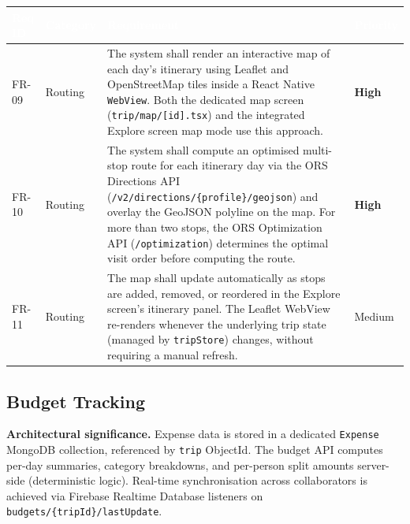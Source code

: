 \documentclass[12pt, a4paper]{article}
\newcommand{\reqid}[1]{\textsc{\small #1}}
\newcommand{\high}{\textbf{High}}
\newcommand{\medium}{Medium}
\newcommand{\thcell}[1]{\textcolor{white}{\textbf{\small #1}}}
\begin{document}
\vspace{0.4em}
\begin{longtable}{C{1.6cm} C{2.0cm} L{8.2cm} C{1.8cm}}
\toprule
{}
\thcell{Req ID} & \thcell{Category} & \thcell{Requirement} & \thcell{Priority} \\
\midrule
\endhead
\bottomrule
\endfoot

\reqid{FR-09} & Routing &
The system shall render an interactive map of each day's itinerary using Leaflet and OpenStreetMap tiles inside a React Native \texttt{WebView}. Both the dedicated map screen (\texttt{trip/map/[id].tsx}) and the integrated Explore screen map mode use this approach. &
\high \\

\reqid{FR-10} & Routing &
The system shall compute an optimised multi-stop route for each itinerary day via the ORS Directions API (\texttt{/v2/directions/\{profile\}/geojson}) and overlay the GeoJSON polyline on the map. For more than two stops, the ORS Optimization API (\texttt{/optimization}) determines the optimal visit order before computing the route. &
\high \\

\reqid{FR-11} & Routing &
The map shall update automatically as stops are added, removed, or reordered in the Explore screen's itinerary panel. The Leaflet WebView re-renders whenever the underlying trip state (managed by \texttt{tripStore}) changes, without requiring a manual refresh. &
\medium \\

\end{longtable}

\subsection{Budget Tracking}

\begin{tcolorbox}[notebox]
  \textbf{Architectural significance.} Expense data is stored in a dedicated \texttt{Expense} MongoDB collection, referenced by \texttt{trip} ObjectId. The budget API computes per-day summaries, category breakdowns, and per-person split amounts server-side (deterministic logic). Real-time synchronisation across collaborators is achieved via Firebase Realtime Database listeners on \texttt{budgets/\{tripId\}/lastUpdate}.
\end{tcolorbox}
\end{document}
